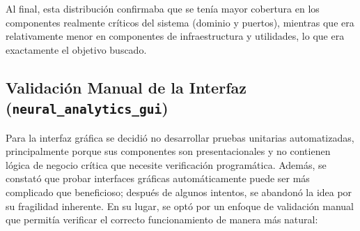 Al final, esta distribución confirmaba que se tenía mayor cobertura en los componentes realmente críticos del sistema (dominio y puertos), mientras que era relativamente menor en componentes de infraestructura y utilidades, lo que era exactamente el objetivo buscado.

\newpage
\subsection{Validación Manual de la Interfaz (\texttt{neural\_analytics\_gui})}

Para la interfaz gráfica se decidió no desarrollar pruebas unitarias automatizadas, principalmente porque sus componentes son presentacionales y no contienen lógica de negocio crítica que necesite verificación programática. Además, se constató que probar interfaces gráficas automáticamente puede ser más complicado que beneficioso; después de algunos intentos, se abandonó la idea por su fragilidad inherente. En su lugar, se optó por un enfoque de validación manual que permitía verificar el correcto funcionamiento de manera más natural:

\begin{table}[ht]
    \centering
    \small
    \caption{Resultados de la validación manual del módulo GUI}
    \label{tab:manual_tests_gui}
\end{table}

